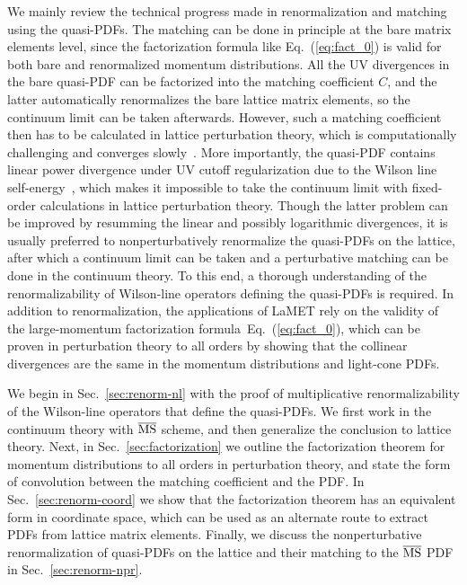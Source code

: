 \documentclass[aps,rmp,reprint,amsmath,amssymb,graphicx,longbibliography]{revtex4-1} %
\newcommand{\MS}{{\overline{\rm MS}}}
\DeclareRobustCommand{\eq}[1]{Eq.~(\ref{eq:#1})}
\DeclareRobustCommand{\sec}[1]{Sec.~\ref{sec:#1}}
\begin{document}
We mainly review the technical progress made in renormalization and matching using the quasi-PDFs.
The matching can be done in principle at the bare matrix elements level,
since the factorization formula like \eq{fact_0} is valid for both bare and
renormalized momentum distributions. All the UV divergences in the bare quasi-PDF can be
factorized into the matching coefficient $C$, and the latter automatically
renormalizes the bare lattice matrix elements, so the continuum limit can be taken afterwards.
However,  such a matching coefficient then has to be calculated in lattice perturbation theory, which is computationally challenging and converges slowly~\cite{Lepage:1992xa}. More importantly, the quasi-PDF contains linear power divergence under UV cutoff regularization due to the Wilson line self-energy~\cite{Ji:2013dva,Xiong:2013bka}, which makes it impossible to take the continuum limit with fixed-order calculations in lattice perturbation theory. Though the latter problem can be improved by resumming the linear and possibly logarithmic divergences, it is usually preferred to nonperturbatively renormalize the quasi-PDFs on the lattice, after which a continuum limit can be taken and a perturbative matching can be done in the continuum theory. To this end, a thorough understanding of the renormalizability of Wilson-line operators defining the quasi-PDFs is required.
In addition to renormalization, the applications of LaMET rely on the validity of the large-momentum factorization formula~\eq{fact_0}, which can be proven in perturbation theory to all orders by showing that the collinear divergences
are the same in the momentum distributions and light-cone PDFs.

We begin in \sec{renorm-nl} with the proof of multiplicative renormalizability of the Wilson-line operators that define the quasi-PDFs. We first work in the continuum theory with $\MS$ scheme, and then generalize the conclusion to lattice theory.
Next, in \sec{factorization} we outline the factorization theorem for momentum distributions to all orders
in perturbation theory, and state the form of convolution between the matching coefficient and the PDF. In \sec{renorm-coord} we show that the factorization theorem has an equivalent form in coordinate space, which can be used as an alternate route to extract PDFs from lattice matrix elements. Finally, we discuss the nonperturbative renormalization of quasi-PDFs on the lattice and their matching to the $\MS$ PDF in \sec{renorm-npr}.

\end{document}
